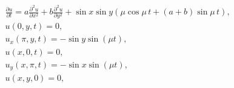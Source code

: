 \documentclass[12pt,a4paper]{article}
\begin{document}
$$
\begin{aligned}
&\frac{\partial u}{\partial t} = a\frac{\partial^2 u}{\partial x^2} + b\frac{\partial^2 u}{\partial y^2} + \sin x \sin y (\mu \cos \mu\,t + (a + b)\sin \mu\,t),\\
&u(0,y,t)=0,\\
&u_x(\pi,y,t)=-\sin y \sin (\mu t),\\
&u(x,0,t)=0,\\
&u_y(x,\pi,t)=-\sin x \sin (\mu t),\\
&u(x,y,0)=0,\\
\end{aligned}
$$
\end{document}

